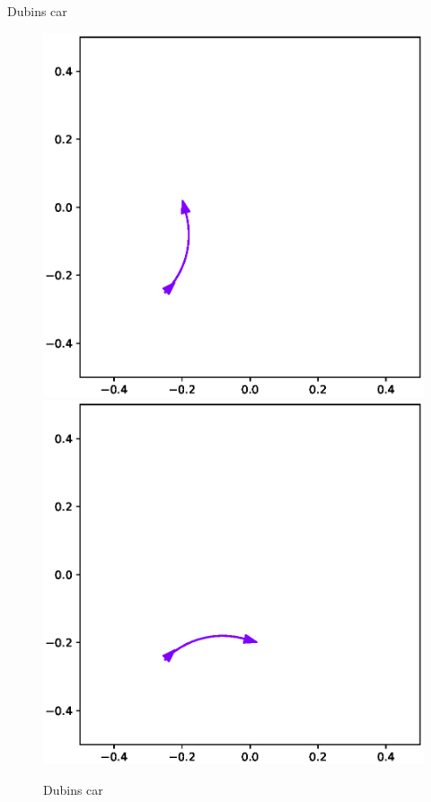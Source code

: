 \documentclass[10pt, xcolor={usenames, dvipsnames}]{beamer}
\begin{document}
\begin{frame}{Dubins car}
\begin{minipage}{.38\textwidth}
\begin{figure}
\begin{overprint}
                        \includegraphics[width=\textwidth]{imgs/dubins_left}
                        \includegraphics[width=\textwidth]{imgs/dubins_right}
                    \end{overprint}
                    \caption{Dubins car}
                \end{figure}
            \end{minipage}


\end{frame}
\end{document}
